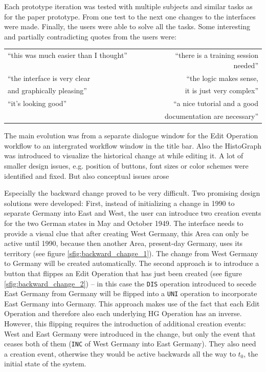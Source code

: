 Each prototype iteration was tested with multiple subjects and similar tasks as for the paper prototype. From one test to the next one changes to the interfaces were made. Finally, the users were able to solve all the tasks. Some interesting and partially contradicting quotes from the users were:
\begin{quoteit}
  \begin{tabular}{l r}
    ``this was much easier than I thought'' ~~~~~~~~ &
    ``there is a training session needed'' \\[0.75em]
    ``the interface is very clear &
    ``the logic makes sense, \\
    and graphically pleasing'' &
    it is just very complex'' \\[0.75em]
    ``it's looking good'' &
    ``a nice tutorial and a good \\
    & documentation are necessary'' \\
  \end{tabular}
\end{quoteit}

The main evolution was from a separate dialogue window for the Edit Operation workflow to an intergrated workflow window in the title bar. Also the HistoGraph was introduced to visualize the historical change at while editing it. A lot of smaller design issues, e.g. position of buttons, font sizes or color schemes were identified and fixed. But also conceptual issues arose

Especially the backward change proved to be very difficult. Two promising design solutions were developed: First, instead of initializing a change in 1990 to separate Germany into East and West, the user can introduce two creation events for the two German states in May and October 1949. The interface needs to provide a visual clue that after creating West Germany, this Area can only be active until 1990, because then another Area, present-day Germany, uses its territory (see figure \ref{sfig:backward_change_1}). The change from West Germany to Germany will be created automatically. The second approach is to introduce a button that flippes an Edit Operation that has just been created (see figure \ref{sfig:backward_change_2}) -- in this case the \texttt{DIS} operation introduced to secede East Germany from Germany will be flipped into a \texttt{UNI} operation to incorporate East Germany into Germany. This approach makes use of the fact that each Edit Operation and therefore also each underlying HG Operation has an inverse.
However, this flipping requires the introduction of additional creation events: West and East Germany were introduced in the change, but only the event that ceases both of them (\texttt{INC} of West Germany into East Germany). They also need a creation event, otherwise they would be active backwards all the way to $t_0$, the initial state of the system.

